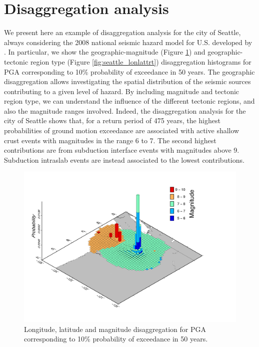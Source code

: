 \section{Disaggregation analysis}
We present here an example of disaggregation analysis for the city of Seattle, always considering the 2008
national seismic hazard model for U.S. developed by \cite{petersen2008}. In particular, we show the geographic-magnitude (Figure \ref{fig:seattle_lonlatmag}) and geographic-tectonic region type (Figure \ref{fig:seattle_lonlattrt}) disaggregation histograms for PGA corresponding to 10\% probability of exceedance in 50 years. The geographic disaggregation allows investigating the spatial distribution of the
seismic sources contributing to a given level of hazard. By including magnitude and tectonic region type,
we can understand the influence of the different tectonic regions, and also the magnitude ranges involved.
Indeed, the disaggregation analysis for the city of Seattle shows that, for a return period of 475 years, the
highest probabilities of ground motion exceedance are associated with active shallow crust events with magnitudes in the range 6 to 7. The second highest contributions are from subduction interface events
with magnitudes above 9. Subduction intraslab events are instead associated to the lowest contributions.
\begin{figure}
\centering
\includegraphics[width=14cm]{./Pictures/Seattle_Lon_Lat_Mag.pdf}
\caption{Longitude, latitude and magnitude disaggregation for PGA corresponding to 10\% probability of exceedance in 50 years.}
\label{fig:seattle_lonlatmag}
\end{figure}

